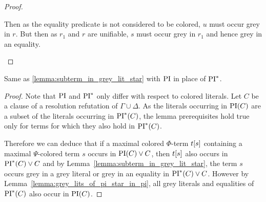 \documentclass[,%
	draft=false,%
	numbers=noendperiod
	12pt,
	a4paper,
	oneside,%
	openany,
]{memoir}
\begin{document}
\begin{proof}
\begin{itemize}
\begin{itemize}
\begin{itemize}
\begin{itemize}
									Then as the equality predicate is not considered to be colored, $u$ must occur grey in $r$.
									But then as $r_1$ and $r$ are unifiable, $s$ must occur grey in $r_1$ and hence grey in an equality.
									\qedhere
							\end{itemize}

					\end{itemize}

			\end{itemize}

	\end{itemize}

\end{proof}

\begin{lemma}
	\label{lemma:subterm_in_grey_lit}
	Same as \ref{lemma:subterm_in_grey_lit_star} with $\operatorname{PI}$ in place of $\operatorname{PI}^*$.
\end{lemma}
\begin{proof}
	Note that $\operatorname{PI}$ and $\operatorname{PI}^*$ only differ with respect to colored literals.
	Let $C$ be a clause of a resolution refutation of $\Gamma \cup \Delta$.
	As the literals occurring in $\operatorname{PI}(C)$ are a subset of the literals occurring in $\operatorname{PI}^*(C)$, the lemma prerequisites hold true only for terms for which they also hold in $\operatorname{PI}^*(C)$.

	Therefore we can deduce that if a maximal colored $\Phi$-term $t[s]$ containing a maximal $\Psi$-colored term $s$ occurs in $\operatorname{PI}(C)\lor C$, then $t[s]$ also occurs in $\operatorname{PI}^*(C) \lor C$ and by Lemma~\ref{lemma:subterm_in_grey_lit_star},
	the term $s$ occurs grey in a grey literal or grey in an equality in $\operatorname{PI}^*(C) \lor C$.
	However by Lemma~\ref{lemma:grey_lits_of_pi_star_in_pi}, all grey literals and equalities of $\operatorname{PI}^*(C)$ also occur in $\operatorname{PI}(C)$.
\end{proof}
\end{document}
